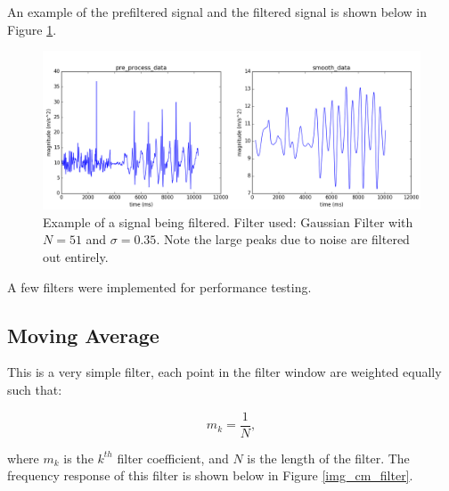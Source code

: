             An example of the prefiltered signal and the filtered signal is shown below in Figure \ref{img_filtered_signal}.

            \begin{figure}[h]
                \includegraphics[width=\textwidth]{Images/filtered_signal.png}
                \centering
                \caption{Example of a signal being filtered. Filter used: Gaussian Filter with $N=51$ and $\sigma=0.35$. Note the large peaks due to noise are filtered out entirely.}
                \label{img_filtered_signal}
            \end{figure}

            A few filters were implemented for performance testing.

            \subsection{Moving Average}

                This is a very simple filter, each point in the filter window are weighted equally such that:

                \begin{equation}
                    m_k = \frac{1}{N},
                \end{equation}

                where $m_k$ is the $k^{th}$ filter coefficient, and $N$ is the length of the filter. The frequency response of this filter is shown below in Figure \ref{img_cm_filter}.

